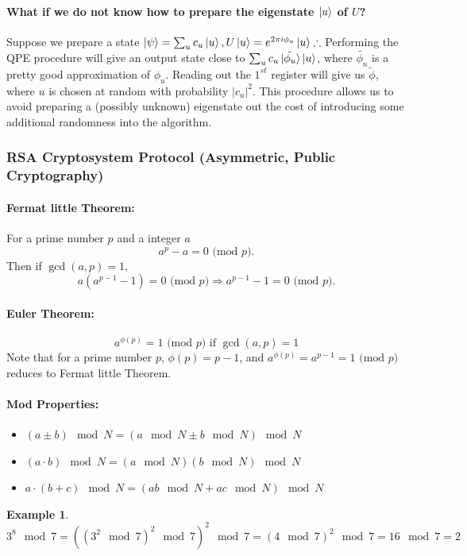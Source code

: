 \documentclass[]{book}
\newtheorem*{example}{Example}
\theoremstyle{nonumberplain}
\begin{document}
\paragraph{What if we do not know how to prepare the eigenstate $\ket{u}$ of $U$?}
Suppose we prepare a state $\ket{\psi}= \sum^{}_{u} c_{u}\ket{u}, U\ket{u}=e^{2\pi i \phi_{u}}\ket{u}\therefore$ Performing the QPE procedure will give an output state close to $ \sum^{}_{u} c_{u}\ket{\tilde{\phi_{u}}}\ket{u}$, where $\tilde{\phi_{n}}$ is a pretty good approximation of $\phi_{u}$. Reading out the $1^{st}$ register will give us $\tilde{\phi}$, where  $u$ is chosen at random with probability $|c_{u}|^{2}$. This procedure allows us to avoid preparing a (possibly unknown) eigenstate out the cost of introducing some additional randomness into the algorithm.

\subsubsection{RSA Cryptosystem Protocol (Asymmetric, Public Cryptography)}
\paragraph{Fermat little Theorem:}
For a prime number $p$ and a integer $a$
$$a^{p}-a = 0 \text{ (mod }p).$$
Then if $\gcd(a, p) = 1$, 
$$a(a^{p-1}-1) = 0 \text{ (mod }p) \Rightarrow a^{p-1}-1 = 0 \text{ (mod }p).$$
\paragraph{Euler Theorem:}
$$a^{\phi(p)} = 1 \text{ (mod } p) \text{ if } \gcd(a, p) = 1$$
Note that for a prime number $p$, $\phi(p) = p-1$, and $a^{\phi(p)} = a^{p-1} = 1 \text{ (mod }p)$ reduces to Fermat little Theorem.\\
\paragraph{Mod Properties:}
\begin{itemize}
    \item $(a \pm b) \mod{N} = (a \mod{N} \pm b \mod{N}) \mod{N}$
    \item $(a \cdot b) \mod{N} = (a \mod{N})(b \mod{N}) \mod{N}$
    \item $a \cdot (b + c) \mod{N} = (ab \mod{N} +ac \mod{N}) \mod{N}$
\end{itemize}
\begin{example}
    $3^{8} \mod{7} = ((3^{2} \mod{7})^{2} \mod{7})^2 \mod{7} = (4 \mod{7})^{2} \mod{7} = 16 \mod{7} = 2$
\end{example}
\\
\end{document}
